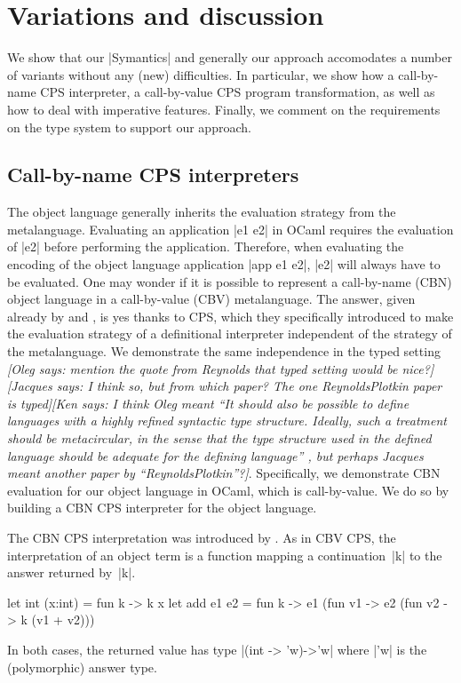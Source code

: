 \documentclass[preprint]{sigplanconf}
\newcommand{\jacques}[1]{{\it [Jacques says: #1]}}
\newcommand{\oleg}[1]{{\it [Oleg says: #1]}}
\newcommand{\ccshan}[1]{{\it [Ken says: #1]}}
\begin{document}
\section{Variations and discussion}\label{discussion}

We show that our |Symantics| and generally our approach accomodates
a number of variants without any (new) difficulties.  In particular,
we show how a call-by-name CPS interpreter, a call-by-value CPS
program transformation, as well as how to deal with imperative features.
Finally, we comment on the requirements on the type system to support 
our approach.

\subsection{Call-by-name CPS interpreters}\label{S:CPS}

The object language generally inherits the evaluation strategy from
the metalanguage. Evaluating an application |e1 e2| in OCaml requires
the evaluation of |e2| before performing the application. Therefore,
when evaluating the encoding of the object language application 
|app e1 e2|, |e2| will always have to be evaluated. One may wonder if it is
possible to represent a call-by-name (CBN) object language in a
call-by-value (CBV) metalanguage. The answer, given already by 
\citet{reynolds-definitional,reynolds-relation} and \citet{PlotkinCBN}, is yes thanks to CPS, which they
specifically introduced 
to make the evaluation strategy of a definitional interpreter
independent of the strategy of the metalanguage. We demonstrate the
same independence in the typed setting \oleg{mention the quote from
Reynolds that typed setting would be nice?}\jacques{I think so, but from
which paper? The one ReynoldsPlotkin paper is typed}\ccshan{I think Oleg
meant ``It should also be possible to define languages with a highly
 refined syntactic type structure. Ideally, such a treatment should be
 metacircular, in
 the sense that the type structure used in the defined language should be adequate for the
 defining language'' \citep{reynolds-definitional}, but perhaps Jacques
 meant another paper by ``ReynoldsPlotkin''?}. Specifically, we
demonstrate CBN evaluation for our object language in OCaml, which is
call-by-value. We do so by building a CBN CPS interpreter for the object
language.

The CBN CPS interpretation was introduced by \citet{PlotkinCBN}. As in
CBV CPS, the interpretation of an object term is a function
mapping a continuation~|k| to the answer
returned by~|k|.
\begin{code}
let int (x:int) = fun k -> k x
let add e1 e2 = fun k ->
  e1 (fun v1 -> e2 (fun v2 -> k (v1 + v2)))
\end{code}
In both cases, the returned value has type 
|(int -> 'w)->'w| where |'w| is the (polymorphic) answer type.
\end{document}
